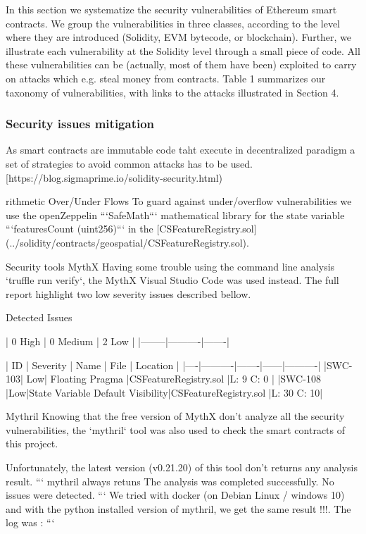 \documentclass{isprs} %
\begin{document}
In this section we systematize the security vulnerabilities of Ethereum smart
contracts. We group the vulnerabilities in three classes, according to the level
where they are introduced (Solidity, EVM bytecode, or blockchain). Further, we
illustrate each vulnerability at the Solidity level through a small piece of code.
All these vulnerabilities can be (actually, most of them have been) exploited to
carry on attacks which e.g. steal money from contracts. Table 1 summarizes our
taxonomy of vulnerabilities, with links to the attacks illustrated in Section 4.

\subsubsection{Security issues mitigation}\label{sec:Security issues mitigation}

As smart contracts are immutable code taht execute in decentralized paradigm a set of strategies to avoid common attacks has to be used. [https://blog.sigmaprime.io/solidity-security.html) 

rithmetic Over/Under Flows
To guard against under/overflow vulnerabilities we use the openZeppelin ```SafeMath``` mathematical library for the state variable ```featuresCount (uint256)``` in the [CSFeatureRegistry.sol](../solidity/contracts/geospatial/CSFeatureRegistry.sol).

Security tools
MythX
Having some trouble using the command line analysis `truffle run verify`, the MythX Visual Studio Code was used instead.
The full report highlight two low severity issues described bellow. 

Detected Issues

| 0 High | 0 Medium | 2 Low |
|--------|----------|-------|

| ID | Severity |  Name | File | Location |
|----|----------|-------|------|----------|
|SWC-103| Low| Floating Pragma |CSFeatureRegistry.sol |L: 9 C: 0 |
|SWC-108 |Low|State Variable Default Visibility|CSFeatureRegistry.sol |L: 30 C: 10|


Mythril
Knowing that the free version of MythX don't analyze all the security vulnerabilities, the `mythril` tool was also used to check the smart contracts of this project.

Unfortunately, the latest version (v0.21.20) of this tool don't returns any analysis result.
```
mythril always retuns  The analysis was completed successfully. No issues were detected.
```
We tried with docker (on Debian Linux / windows 10) and with the python installed version of mythril, we get the same result !!!. The log was :
```
\end{document}
